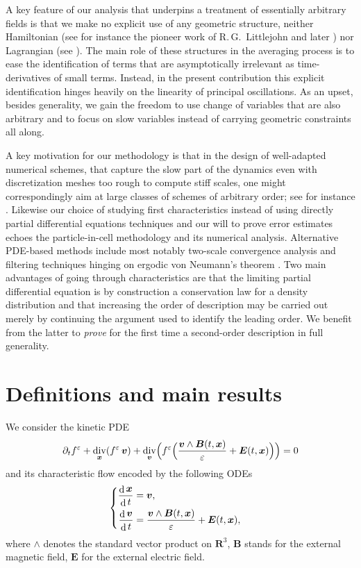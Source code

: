 \documentclass[10pt]{amsart}
\newenvironment{splitcases}
{\begin{cases}\begin{aligned}}
{\end{aligned}\end{cases}}
\let\eps\varepsilon
\let\d\partial
\DeclareMathOperator\dD{d}\let\dd\dD
\DeclareMathOperator{\Div}{div}
\theoremstyle{plain}
\theoremstyle{definition}
\newcommand{\be}{\begin{equation}}
\newcommand{\ee}{\end{equation}}
\newcommand\R{\mathbf R}
\newcommand\bB{{\boldsymbol B}}
\newcommand\bE{{\boldsymbol E}}
\newcommand\bfv{{\boldsymbol v}}
\newcommand\bfx{{\boldsymbol x}}
\begin{document}
A key feature of our analysis that underpins a treatment of
essentially arbitrary fields is that we make no explicit use of any
geometric structure, neither Hamiltonian (see for instance the pioneer
work of R.\,G.\ Littlejohn \cite{littleJ1, littleJ2, littleJ3} and later
\cite{Benettin-Sempio,FrenodLutz_geometrical_gyro-kinetic}) nor Lagrangian (see \cite{Possanner}). The main role of these structures in the averaging process is to ease the identification of terms that are asymptotically irrelevant as time-derivatives of small terms. Instead, in the present contribution this explicit identification hinges heavily on the linearity of principal oscillations. As an upset, besides generality, we gain the freedom to use change of variables that are also arbitrary and to focus on slow variables instead of carrying geometric constraints all along.

A key motivation for our methodology is that in the design of
well-adapted numerical schemes, that capture the slow part of the
dynamics even with discretization meshes too rough to compute stiff
scales, one might correspondingly aim at large classes of schemes of
arbitrary order; see for instance \cite{SFFOV, Lee,FR1,FR2}. Likewise our choice of studying first characteristics instead of using directly partial differential equations techniques and our will to prove error estimates echoes the particle-in-cell methodology and its numerical analysis. Alternative PDE-based methods include most notably two-scale convergence analysis \cite{fre_son_97,fre_son_98} and filtering techniques hinging on ergodic von Neumann's theorem \cite{Bostan_transport,bostan_10}. Two main advantages of going through characteristics are that the limiting partial differential equation is by construction a conservation law for a density distribution and that increasing the order of description may be carried out merely by continuing the argument used to identify the leading order. We benefit from the latter to \emph{prove} for the first time a second-order description in full generality.

\section{Definitions and main results}
\label{s:results}

We consider the kinetic PDE
\be\label{eq:vlasov}
\d_t f^\eps+\Div_\bfx(f^\eps\,\bfv)
+\Div_\bfv\Bigl(f^\eps\Bigl(\frac{\bfv\wedge \bB(t,\bfx)}{\eps}+\bE(t,\bfx)\Bigr)\Bigr)=0
\ee
and its characteristic flow encoded by the following ODEs
\be
\label{eq:xv}
\begin{splitcases}
\frac{\dD\bfx}{\dD t}&=\bfv,
\\
\frac{\dD\bfv}{\dD t}&=\frac{\bfv\wedge \bB(t,\bfx)}{\eps} +\bE(t,\bfx),
\end{splitcases}
\ee
where $\wedge$ denotes the standard vector product on $\R^3$, $\bB$ stands for the external magnetic field, $\bE$ for the external electric field.
\end{document}
